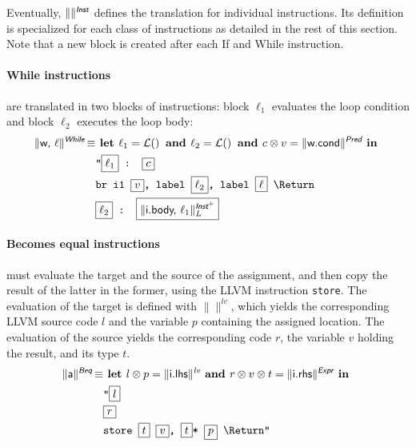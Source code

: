\documentclass{llncs}
\newcommand{\trad}[2]{\ensuremath{\lVert \textsf{#1} \rVert^{\textit{#2}}}}
\newcommand{\nl}[0]{\text{\Return}}
\DeclareMathOperator{\conc}{\diamond}
\DeclareMathOperator{\isdef}{\equiv}
\DeclareMathOperator{\name}{\mathcal{L}()}
\newcommand{\llvm}[1]{\texttt{#1}}
\newcommand{\B}[1]{\textsf{#1}}
\newcommand{\ListOf}[1]{$\mbox{#1}^+$}
\newcommand{\LET}[0]{\textbf{ let }}
\newcommand{\IN}[0]{\textbf{ in }}
\newcommand{\AND}[0]{\textbf{ and }}
\newcommand{\PH}[1]{\framebox{$#1$}}
\newcommand{\sep}[0]{\otimes}
\begin{document}
Eventually, $\trad{}{\B{Inst}}$ defines the translation for individual
instructions. Its definition is specialized for each class of instructions as
detailed in the rest of this section. Note that a new block is created after
each \B{If} and \B{While} instruction.

\paragraph{While instructions} are translated in two blocks of instructions:
block $\ell_1$ evaluates the loop condition and block $\ell_2$ executes the loop
body:
\begin{align*}
\begin{split}
\trad{w, $\ell$}{\B{While}} \isdef 
  & \LET \ell_1 = \name \AND \ell_2 = \name \AND c \sep v = \trad{w.cond}{\B{Pred}} \IN \\
  & \llvm{"\PH{\ell_1} : \PH{c}} \\
  & \llvm{br i1 \PH{v}, label \PH{\ell_2}, label \PH{\ell} \nl} \\
  & \llvm{\PH{\ell_2} : \PH{\trad{i.body, $\ell_1$}{\ListOf{\B{Inst}}}_L}}
\end{split}
\end{align*}

\paragraph{Becomes equal instructions} must evaluate the target and the source
of the assignment, and then copy the result of the latter in the former, using
the LLVM instruction \llvm{store}. The evaluation of the target is defined with
$\trad{}{lv}$, which yields the corresponding LLVM source code $l$ and the
variable $p$ containing the assigned location. The evaluation of the source
yields the corresponding code $r$, the variable $v$ holding the result, and its
type $t$.
\begin{align*}
\begin{split}
  \trad{a}{\B{Beq}} \isdef 
  & \LET l \sep p = \trad{i.lhs}{lv} \AND r \sep v \sep t = \trad{i.rhs}{\B{Expr}} \IN \\
  & \llvm{"\PH{l}} \\
  & \llvm{\PH{r}} \\
  & \llvm{store \PH{t} \PH{v}, \PH{t}* \PH{p} \nl"}
\end{split}
\end{align*}
\end{document}
